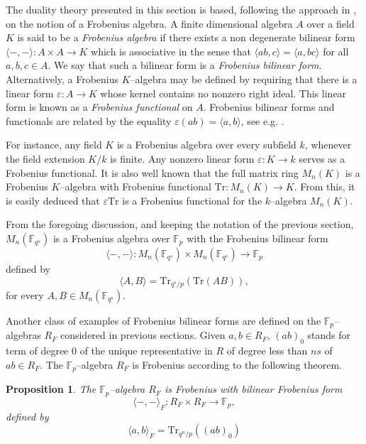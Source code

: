 \documentclass[a4paper, 11pt]{article}
\newtheorem{proposition}[theorem]{Proposition}
\newcommand{\F}{{\mathbb F}}
\newcommand{\Tr}{{\mathrm{Tr}}}
\begin{document}
The duality theory presented in this section is based, following the approach in \cite{gomez2020some}, on the notion of a Frobenius algebra.  A finite dimensional algebra \(A\) over a field \(K\) is said to be a \emph{Frobenius algebra} if there exists a non degenerate  bilinear form \(\langle -,-\rangle : A \times A \to K\) which is associative in the sense that \(\langle ab, c \rangle = \langle a, bc\rangle \) for all \(a,b,c \in A\). We say that such a bilinear form is a \emph{Frobenius bilinear form}. Alternatively, a Frobenius \(K\)--algebra may be defined by requiring that there is a linear form \(\varepsilon: A \to K\) whose kernel contains no nonzero right ideal. This linear form is known as a \emph{Frobenius functional} on \(A\). Frobenius bilinear forms and functionals are related by the equality \(\varepsilon (ab) = \langle a, b \rangle \), see e.g. \cite[Remark 2]{gomez2020some}. 


For instance, any field \(K\) is a Frobenius algebra over every subfield \(k\), whenever the field extension \(K/k\) is finite. Any nonzero linear form \(\varepsilon : K \to k\) serves as a Frobenius functional. It is also well known that the full matrix ring \(M_n(K)\) is a Frobenius \(K\)--algebra with Frobenius functional \(\Tr : M_n(K) \to K \). From this, it is easily deduced that \(\varepsilon \Tr\) is a Frobenius functional for the \(k\)--algebra \(M_n(K)\).

From the foregoing discussion, and keeping the notation of the previous section, \(M_n(\F_{q^s})\) is a Frobenius algebra over \(\F_p\) with the Frobenius bilinear form 
\[
\langle -,- \rangle: M_n(\F_{q^s}) \times M_n(\F_{q^s}) \rightarrow \F_p 
\]
defined by 
\begin{equation} \label{eq:bilinearmatrix}
\langle A,B \rangle=\Tr_{q^s/p}(\Tr(AB)),
\end{equation}
for every $A,B \in M_n(\F_{q^s})$. 





Another class of examples of Frobenius bilinear forms are defined on the \(\F_p\)--algebras \(R_F\) considered in previous sections. Given \(a, b \in R_F\), \((ab)_0\) stands for  term of degree \(0\) of the unique representative in \(R\) of degree less than \(ns\) of \(ab \in R_F\). The \(\F_p\)--algebra \(R_F\) is Frobenius according to the following theorem.


\begin{proposition} \label{th:bilinearformonRF}
    The \(\F_p\)--algebra \(R_F\) is Frobenius with bilinear Frobenius form 
    \[
    \langle -,- \rangle_F: R_F \times R_F \longrightarrow \F_p,\]
  defined by
    \begin{equation} \label{eq:bilinearoverRF}
    \langle a,b \rangle_F=\Tr_{q^n/p}\left((ab)_0\right)%
     \end{equation}
\end{proposition}
\end{document}
